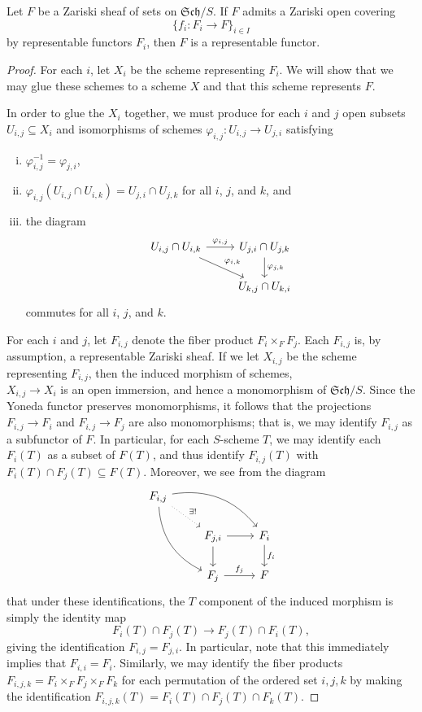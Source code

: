 \documentclass[10pt]{amsart}
\begin{document}
\begin{thm}
  Let $F$ be a Zariski sheaf of sets on $\mathfrak{Sch}/S$.
  If $F$ admits a Zariski open covering
  $$\{f_i : F_i \rightarrow F\}_{i \in I}$$
  by representable functors $F_i$, then $F$ is a representable functor.

  \begin{proof}
    For each $i$, let $X_i$ be the scheme representing $F_i$.
    We will show that we may glue these schemes to a scheme $X$ and that this scheme represents $F$.

    In order to glue the $X_i$ together, we must produce for each $i$ and $j$ open subsets $U_{i,j} \subseteq X_i$ and isomorphisms of schemes $\varphi_{i,j} : U_{i,j} \rightarrow U_{j,i}$ satisfying
    \begin{enumerate}[(i)]
    \item
       $\varphi_{i,j}^{-1} = \varphi_{j,i}$,
    \item
      $\varphi_{i,j}(U_{i,j} \cap U_{i,k}) = U_{j,i} \cap U_{j,k}$ for all $i$, $j$, and $k$, and
    \item
      the diagram
      $$\begin{tikzcd}
        U_{i,j} \cap U_{i,k} \arrow{rd}{\varphi_{i,k}}\arrow{r}{\varphi_{i,j}} & U_{j,i} \cap U_{j,k}\arrow{d}{\varphi_{j,k}}\\
        & U_{k,j} \cap U_{k,i}
      \end{tikzcd}$$
      commutes for all $i$, $j$, and $k$.
    \end{enumerate}

    For each $i$ and $j$, let $F_{i,j}$ denote the fiber product $F_i \times_F F_j$.
    Each $F_{i,j}$ is, by assumption, a representable Zariski sheaf.
    If we let $X_{i,j}$ be the scheme representing $F_{i,j}$, then the induced morphism of schemes,\\ $X_{i,j} \rightarrow X_i$ is an open immersion, and hence a monomorphism of $\mathfrak{Sch}/S$.
    Since the Yoneda functor preserves monomorphisms, it follows that the projections $F_{i,j} \rightarrow F_i$ and $F_{i,j} \rightarrow F_j$ are also monomorphisms; that is, we may identify $F_{i,j}$ as a subfunctor of $F$.
    In particular, for each $S$-scheme $T$, we may identify each $F_i(T)$ as a subset of $F(T)$, and thus identify $F_{i,j}(T)$ with $F_i(T) \cap F_j(T) \subseteq F(T)$.
    Moreover, we see from the diagram
    $$\begin{tikzcd}
      F_{i,j}\arrow[dotted]{rd}{\exists !}\arrow[bend right]{ddr} \arrow[bend left]{rrd}\\
      & F_{j,i}\arrow{r}\arrow{d} & F_i\arrow{d}{f_i}\\
      & F_{j}\arrow{r}{f_j} & F
    \end{tikzcd}$$
    that under these identifications, the $T$ component of the induced morphism is simply the identity map
    $$F_i(T) \cap F_j(T) \rightarrow F_j(T) \cap F_i(T),$$
    giving the identification $F_{i,j} = F_{j,i}$.
    In particular, note that this immediately implies that $F_{i,i} = F_i$.
    Similarly, we may identify the fiber products $F_{i,j,k} = F_i \times_F F_j \times_F F_k$ for each permutation of the ordered set ${i,j,k}$ by making the identification $F_{i,j,k}(T) = F_i(T) \cap F_j(T) \cap F_k(T)$.


\end{proof}
\end{thm}
\end{document}
